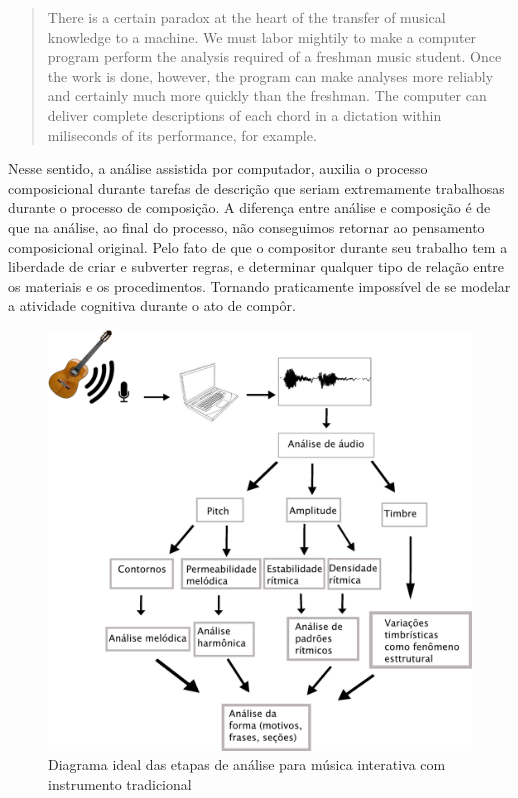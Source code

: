 \documentclass{ppgmus}
\begin{document}
\begin{quotation}
There is a certain paradox at the heart of the transfer of musical
knowledge to a machine. We must labor mightily to make a computer
program perform the analysis required of a freshman music student.
Once the work is done, however, the program can make analyses more reliably
and certainly much more quickly than the freshman. The computer can deliver 
complete descriptions of each chord in a dictation within miliseconds
of its performance, for example.
\end{quotation}


Nesse sentido, a análise assistida por computador, auxilia
o processo composicional durante tarefas de descrição que seriam
extremamente trabalhosas durante o processo de composição.
A diferença entre análise e composição é de que na análise, ao final do
processo, não conseguimos retornar ao pensamento composicional
original. Pelo fato de que o compositor durante seu trabalho tem a 
liberdade de criar e subverter regras, e determinar qualquer tipo de relação
entre os materiais e os procedimentos. Tornando praticamente impossível
de se modelar a atividade cognitiva durante o ato de compôr.

\begin{figure}
\includegraphics[scale=.6]{analise}
\caption{Diagrama ideal das etapas de análise para música interativa com instrumento tradicional}
\label{analise-geral}
\end{figure} 
\end{document}
